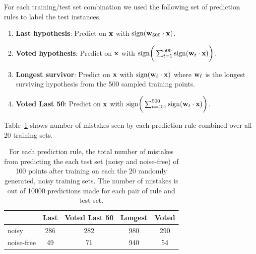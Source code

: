 \documentclass[12pt]{article}
\begin{document}
\begin{enumerate}
\begin{enumerate}
For each training/test set combination we used the following set of prediction
rules to label the test instances.

\begin{enumerate}
    \item {\bf Last hypothesis}:
        Predict on ${\bf x}$ with $\text{sign}({\bf w}_{500} \cdot {\bf x})$.
    \item {\bf Voted hypothesis}:
        Predict on ${\bf x}$ with $\text{sign}\bigg(\sum_{t=1}^{500}\text{sign}({\bf w}_t \cdot {\bf x})\bigg)$.
    \item {\bf Longest survivor}:
        Predict on ${\bf x}$ with $\text{sign}({\bf w}_\ell \cdot {\bf x})$ where ${\bf w}_\ell$ is the longest surviving hypothesis from the 500 sampled training points.
    \item {\bf Voted Last 50}:
        Predict on ${\bf x}$ with $\text{sign}\bigg(\sum_{t=451}^{500}\text{sign}({\bf w}_t \cdot {\bf x})\bigg)$.
\end{enumerate}

Table~\ref{tab:ex2} shows number of mistakes seen by each prediction rule combined over all 20
training sets.

\begin{table}[htd]
\begin{center}
\begin{tabular}{l||c|c|c|c}
           & Last  & Voted Last 50 & Longest & Voted \\
               \hline
  noisy  &   286  &   282  &   980  &   290 \\ 
  noise-free  &    49  &    71  &   940   &   54 \\
\end{tabular}
\end{center}
\caption{
For each prediction rule, the total number of mistakes from predicting the
each test set (noisy and noise-free) of 100 points after training on each
the 20 randomly generated, noisy training sets. The number of mistakes is
out of 10000 predictions made for each pair of rule and test set.}
\label{tab:ex2}
\end{table}%



\end{enumerate}
\end{enumerate}
\end{document}
